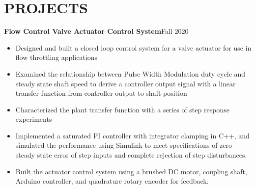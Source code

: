 \documentclass{article}
\begin{document}
\section{PROJECTS}
\vspace{0.5em}
\textbf{Flow Control Valve Actuator Control System}\hfill Fall 2020
\vspace{0.5em}
\begin{itemize}
	\item Designed and built a closed loop control system for a valve actuator for use in flow throttling applications
	\item Examined the relationship between Pulse Width Modulation duty cycle and steady state shaft speed to derive a controller output signal with a linear transfer function from controller output to shaft position  
	\item Characterized the plant transfer function with a series of step response experiments
	\item  Implemented a saturated PI controller with integrator clamping in C++, and simulated the performance using Simulink to meet specifications of zero steady state error of step inputs and complete rejection of step disturbances.
	\item  Built the actuator control system using a brushed DC motor, coupling shaft, Arduino controller, and quadrature rotary encoder for feedback.
\end{itemize}
\vspace{0.5em}
\thispagestyle{empty}
\thispagestyle{empty}
\end{document}
